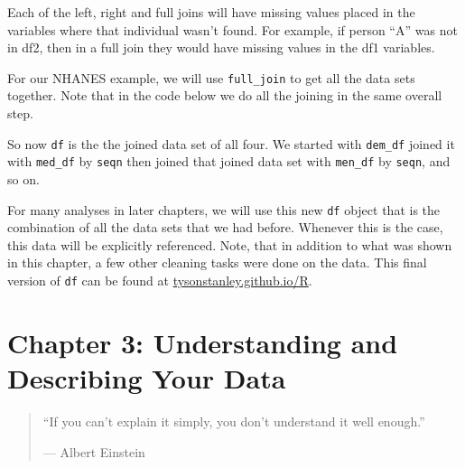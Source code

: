 \documentclass[]{tufte-book}
\newenvironment{Shaded}{}{}
\newcommand{\KeywordTok}[1]{\textcolor[rgb]{0.00,0.44,0.13}{\textbf{#1}}}
\newcommand{\DataTypeTok}[1]{\textcolor[rgb]{0.56,0.13,0.00}{#1}}
\newcommand{\StringTok}[1]{\textcolor[rgb]{0.25,0.44,0.63}{#1}}
\newcommand{\OperatorTok}[1]{\textcolor[rgb]{0.40,0.40,0.40}{#1}}
\newcommand{\NormalTok}[1]{#1}
\theoremstyle{definition}
\theoremstyle{definition}
\theoremstyle{remark}
\begin{document}
Each of the left, right and full joins will have missing values placed
in the variables where that individual wasn't found. For example, if
person ``A'' was not in df2, then in a full join they would have missing
values in the df1 variables.

For our NHANES example, we will use \texttt{full\_join} to get all the
data sets together. Note that in the code below we do all the joining in
the same overall step.

\begin{Shaded}
\end{Shaded}

So now \texttt{df} is the the joined data set of all four. We started
with \texttt{dem\_df} joined it with \texttt{med\_df} by \texttt{seqn}
then joined that joined data set with \texttt{men\_df} by \texttt{seqn},
and so on.

For many analyses in later chapters, we will use this new \texttt{df}
object that is the combination of all the data sets that we had before.
Whenever this is the case, this data will be explicitly referenced.
Note, that in addition to what was shown in this chapter, a few other
cleaning tasks were done on the data. This final version of \texttt{df}
can be found at
\href{http://www.tysonstanley.github.io/R}{tysonstanley.github.io/R}.

\chapter*{Chapter 3: Understanding and Describing Your
Data}\label{chapter-3-understanding-and-describing-your-data}

\begin{quote}
``If you can't explain it simply, you don't understand it well enough.''

--- Albert Einstein
\end{quote}
\end{document}
